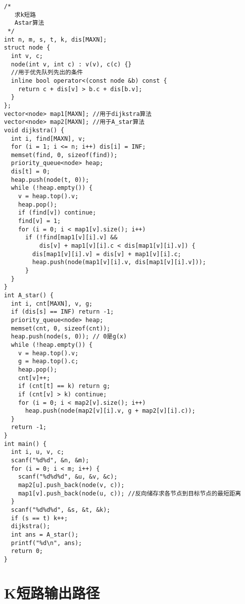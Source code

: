 \begin{lstlisting}
/*
   求k短路
   Astar算法
 */
int n, m, s, t, k, dis[MAXN];
struct node {
  int v, c;
  node(int v, int c) : v(v), c(c) {}
  //用于优先队列先出的条件
  inline bool operator<(const node &b) const {
    return c + dis[v] > b.c + dis[b.v];
  }
};
vector<node> map1[MAXN]; //用于dijkstra算法
vector<node> map2[MAXN]; //用于A_star算法
void dijkstra() {
  int i, find[MAXN], v;
  for (i = 1; i <= n; i++) dis[i] = INF;
  memset(find, 0, sizeof(find));
  priority_queue<node> heap;
  dis[t] = 0;
  heap.push(node(t, 0));
  while (!heap.empty()) {
    v = heap.top().v;
    heap.pop();
    if (find[v]) continue;
    find[v] = 1;
    for (i = 0; i < map1[v].size(); i++)
      if (!find[map1[v][i].v] &&
          dis[v] + map1[v][i].c < dis[map1[v][i].v]) {
        dis[map1[v][i].v] = dis[v] + map1[v][i].c;
        heap.push(node(map1[v][i].v, dis[map1[v][i].v]));
      }
  }
}
int A_star() {
  int i, cnt[MAXN], v, g;
  if (dis[s] == INF) return -1;
  priority_queue<node> heap;
  memset(cnt, 0, sizeof(cnt));
  heap.push(node(s, 0)); // 0是g(x)
  while (!heap.empty()) {
    v = heap.top().v;
    g = heap.top().c;
    heap.pop();
    cnt[v]++;
    if (cnt[t] == k) return g;
    if (cnt[v] > k) continue;
    for (i = 0; i < map2[v].size(); i++)
      heap.push(node(map2[v][i].v, g + map2[v][i].c));
  }
  return -1;
}
int main() {
  int i, u, v, c;
  scanf("%d%d", &n, &m);
  for (i = 0; i < m; i++) {
    scanf("%d%d%d", &u, &v, &c);
    map2[u].push_back(node(v, c));
    map1[v].push_back(node(u, c)); //反向储存求各节点到目标节点的最短距离
  }
  scanf("%d%d%d", &s, &t, &k);
  if (s == t) k++;
  dijkstra();
  int ans = A_star();
  printf("%d\n", ans);
  return 0;
}
\end{lstlisting}

\section{K短路输出路径}

